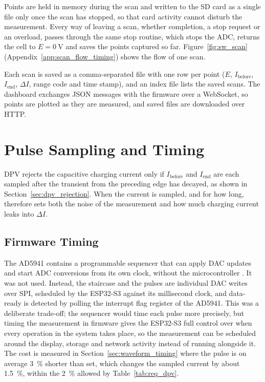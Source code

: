 Points are held in memory during the scan and written to the SD card as a
single file only once the scan has stopped, so that card activity cannot
disturb the measurement. Every way of leaving a scan, whether completion, a
stop request or an overload, passes through the same stop routine, which stops
the ADC, returns the cell to $E = \SI{0}{\volt}$ and saves the points captured
so far. Figure~\ref{fig:sw_scan} (Appendix~\ref{app:scan_flow_timing}) shows the flow of one scan.

Each scan is saved as a comma-separated file with one row per point ($E$, $I_\text{before}$, $I_\text{end}$, $\Delta I$, range code and time stamp), and an index file lists the saved scans. The dashboard exchanges JSON messages with the firmware over a WebSocket, so points are plotted as they are measured, and saved files are downloaded over HTTP.

\section{Pulse Sampling and Timing}
\label{sec:sw_sampling}

DPV rejects the capacitive charging current only if $I_\text{before}$ and
$I_\text{end}$ are each sampled after the transient from the preceding edge
has decayed, as shown in Section~\ref{sec:dpv_rejection}. When the current is sampled, and for how long, therefore sets both
the noise of the measurement and how much charging current leaks into
$\Delta I$.

\subsection{Firmware Timing}
\label{sec:sw_timing}

The AD5941 contains a programmable sequencer that can apply DAC updates and start ADC conversions from its own clock, without the microcontroller \cite{ad5941_ds}. It was not used. Instead, the staircase and the pulses are individual DAC writes over SPI, scheduled by the ESP32-S3 against its millisecond clock, and data-ready is detected by polling the interrupt flag register of the AD5941. This was a deliberate trade-off; the sequencer would time each pulse more precisely, but timing the measurement in firmware gives the ESP32-S3 full control over when every operation in the system takes place, so the measurement can be scheduled around the display, storage and network activity instead of running alongside it. The cost is measured in Section~\ref{sec:waveform_timing} where the pulse is on average \SI{3}{\percent} shorter than set, which changes the sampled current by about \SI{1.5}{\percent}, within the \SI{2}{\percent} allowed by Table~\ref{tab:req_dpv}.

